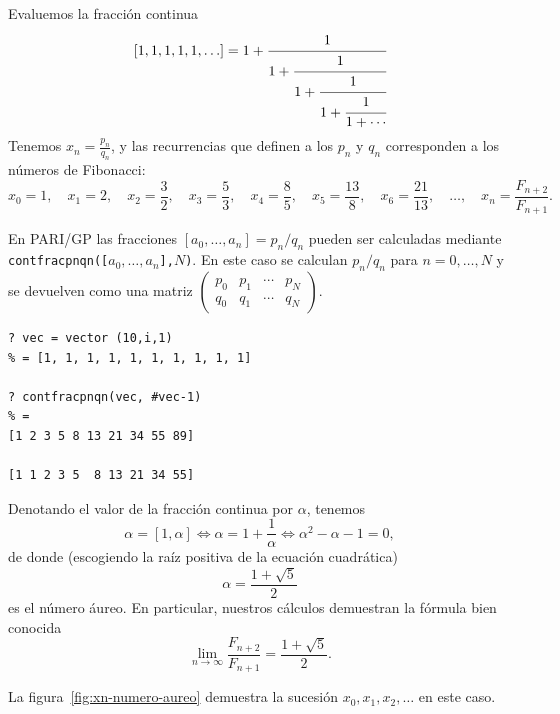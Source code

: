 \begin{ejemplo}
  Evaluemos la fracción continua
  \[ [1,1,1,1,1,\ldots] =  1 + \cfrac{1}{1 + \cfrac{1}{1 + \cfrac{1}{1 + \cfrac{1}{1 + \cdots}}}} \]
  Tenemos $x_n = \frac{p_n}{q_n}$, y las recurrencias que definen a los
  $p_n$ y $q_n$ corresponden a los números de Fibonacci:
  \[ x_0 = 1, \quad
     x_1 = 2, \quad
     x_2 = \frac{3}{2}, \quad
     x_3 = \frac{5}{3}, \quad
     x_4 = \frac{8}{5}, \quad
     x_5 = \frac{13}{8}, \quad
     x_6 = \frac{21}{13}, \quad
     \ldots, \quad
     x_n = \frac{F_{n+2}}{F_{n+1}}. \]

  \begin{shaded}\small
    En PARI/GP las fracciones $[a_0, \ldots, a_n] = p_n/q_n$ pueden ser
    calculadas mediante \texttt{contfracpnqn([$a_0,\ldots,a_n$],$N$)}. En este
    caso se calculan $p_n/q_n$ para $n = 0, \ldots, N$ y se devuelven como una
    matriz
    $\begin{pmatrix} p_0 & p_1 & \cdots & p_N \\ q_0 & q_1 & \cdots & q_N \end{pmatrix}$.
\begin{verbatim}
? vec = vector (10,i,1)
% = [1, 1, 1, 1, 1, 1, 1, 1, 1, 1]

? contfracpnqn(vec, #vec-1)
% = 
[1 2 3 5 8 13 21 34 55 89]

[1 1 2 3 5  8 13 21 34 55]
\end{verbatim}
  \end{shaded}
 
  Denotando el valor de la fracción continua por $\alpha$, tenemos
  $$\alpha = [1,\alpha] \iff \alpha = 1 + \frac{1}{\alpha} \iff \alpha^2 - \alpha - 1 = 0,$$
  de donde (escogiendo la raíz positiva de la ecuación cuadrática)
  $$\alpha = \frac{1 + \sqrt{5}}{2}$$
  es el número áureo. En particular, nuestros cálculos demuestran la fórmula
  bien conocida
  $$\lim_{n\to\infty} \frac{F_{n+2}}{F_{n+1}} = \frac{1 + \sqrt{5}}{2}.$$

  La figura~\ref{fig:xn-numero-aureo} demuestra la sucesión $x_0,x_1,x_2,\ldots$
  en este caso.
\end{ejemplo}

